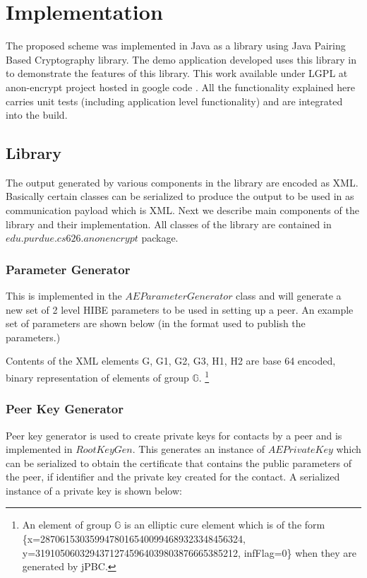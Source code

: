 \section{Implementation}
The proposed scheme was implemented in Java as a library using Java Pairing Based Cryptography \cite{jpbc} library. The demo application developed uses this library in to demonstrate the features of this library. This work available under LGPL at anon-encrypt project hosted in google code \cite{ae}. All the functionality explained here carries unit tests (including application level functionality) and are integrated into the build.

\subsection{Library}

The output generated by various components in the library are encoded as XML. Basically certain classes can be serialized to produce the output to be used in as communication payload which is XML. Next we describe main components of the library and their implementation. All classes of the library are contained in $edu.purdue.cs626.anonencrypt$ package.

\subsubsection{Parameter Generator}
This is implemented in the $AEParameterGenerator$ class and will generate a new set of 2 level HIBE parameters to be used in setting up a peer. An example set of parameters are shown below (in the format used to publish the parameters.)



Contents of the XML elements G, G1, G2, G3, H1, H2 are base 64 encoded, binary representation of elements of group $\mathbb{G}$. \footnote{An element of group $\mathbb{G}$ is an elliptic cure element which is of the form \{x=28706153035994780165400994689323348456324, y=31910506032943712745964039803876665385212, infFlag=0\} when they are generated by jPBC.}\\

\subsubsection{Peer Key Generator}
Peer key generator is used to create private keys for contacts by a peer and is implemented in $RootKeyGen$. This generates an instance of $AEPrivateKey$ which can be serialized to obtain the certificate that contains the public parameters of the peer, if identifier and the private key created for the contact. A serialized instance of a private key is shown below:

